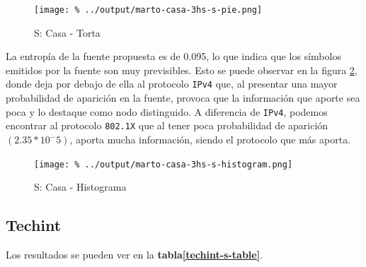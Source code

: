 \documentclass[final,inline,a4paper,narroweqnarray]{ieee}
\begin{document}
    \begin{figure}[ht]\begin{center}
      \texttt{[image: \%
      ../output/marto-casa-3hs-s-pie.png]}
      \vspace{-3em}
      \caption{S: Casa - Torta}
      \label{marto-casa-3hs-s-pie}
    \end{center}\end{figure}

    La entropía de la fuente propuesta es de 0.095, lo que indica que
    los símbolos emitidos por la fuente son muy previsibles. Esto se
    puede observar en la figura \ref{marto-casa-3hs-s-histogram},
    donde deja por debajo de ella al protocolo \texttt{IPv4} que, al
    presentar una mayor probabilidad de aparición en la fuente,
    provoca que la información que aporte sea poca y lo destaque como
    nodo distinguido. A diferencia de \texttt{IPv4}, podemos encontrar
    al protocolo \texttt{802.1X} que al tener poca probabilidad de
    aparición $(2.35 * 10^-5)$, aporta mucha información, siendo el
    protocolo que más aporta.

    
    \begin{figure}[ht]\begin{center}
     \texttt{[image: \%
      ../output/marto-casa-3hs-s-histogram.png]}
      \caption{S: Casa - Histograma}
      \label{marto-casa-3hs-s-histogram}
    \end{center}\end{figure}

    \subsection{Techint}

    Los resultados se pueden ver en la
    \textbf{tabla\ref{techint-s-table}}.
\end{document}
